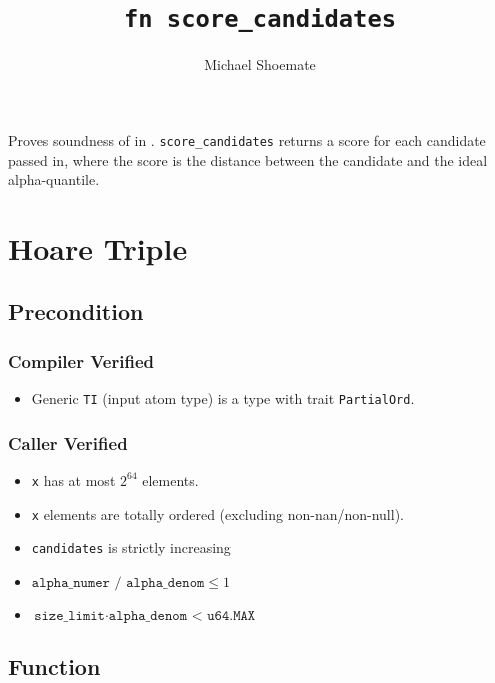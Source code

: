\documentclass{article}
\title{\texttt{fn score\_candidates}}
\author{Michael Shoemate}
\begin{document}
\maketitle  


\contrib

Proves soundness of  
in .
\texttt{score\_candidates} returns a score for each candidate passed in, 
where the score is the distance between the candidate and the ideal alpha-quantile.

\section{Hoare Triple}
\subsection*{Precondition}
\subsubsection*{Compiler Verified}
\begin{itemize}
    \item Generic \texttt{TI} (input atom type) is a type with trait \texttt{PartialOrd}.
\end{itemize}

\subsubsection*{Caller Verified}
\begin{itemize}
    \item \texttt{x} has at most $2^{64}$ elements.
    \item \texttt{x} elements are totally ordered (excluding non-nan/non-null).
    \item \texttt{candidates} is strictly increasing
    \item $\texttt{alpha\_numer / alpha\_denom} \le 1$
    \item $\texttt{size\_limit} \cdot \texttt{alpha\_denom < u64.MAX}$
\end{itemize}


\subsection*{Function}
\label{sec:python-pseudocode}

\end{document}
